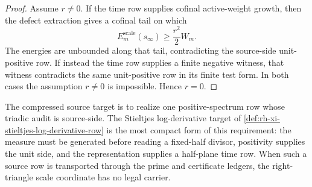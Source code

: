 \begin{proof}
Assume $r\ne0$.  If the time row supplies cofinal active-weight growth,
then the defect extraction gives a cofinal tail on which
$$
E_m^{\mathrm{scale}}(s_\infty)\ge\frac{r^2}{2}W_m.
$$
The energies are unbounded along that tail, contradicting the
source-side unit-positive row.  If instead the time row supplies a
finite negative witness, that witness contradicts the same
unit-positive row in its finite test form.  In both cases the assumption
$r\ne0$ is impossible.  Hence $r=0$.
\end{proof}

\begin{principle}
\label{prin:rh-compressed-source-target}
The compressed source target is to realize one positive-spectrum row
whose triadic audit is source-side.  The Stieltjes log-derivative target
of \autoref{def:rh-xi-stieltjes-log-derivative-row} is the most compact
form of this requirement: the measure must be generated before reading a
fixed-half divisor, positivity supplies the unit side, and the
representation supplies a half-plane time row.  When such a source row
is transported through the prime and certificate ledgers, the
right-triangle scale coordinate has no legal carrier.
\end{principle}
